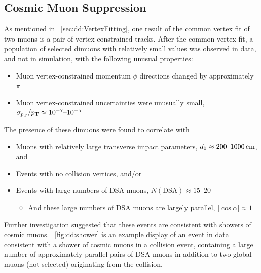 \subsection{Cosmic Muon Suppression}
\label{sec:dd:CosmicCuts}
As mentioned in \Sec~\ref{sec:dd:VertexFitting}, one result of the common vertex fit of two muons is a pair of vertex-constrained tracks.
After the common vertex fit, a population of selected dimuons with relatively small \vchisq values was observed in data, and not in simulation, with the following unusual properties:
\begin{itemize}
  \item Muon vertex-constrained momentum $\phi$ directions changed by approximately $\pi$
  \item Muon vertex-constrained \pT uncertainties were unusually small, \ie $\sigma_{p_{\mathrm{T}}}/p_{\mathrm{T}} \approx 10^{-7}\text{--}10^{-5}$
\end{itemize}
The presence of these dimuons were found to correlate with
\begin{itemize}
  \item Muons with relatively large transverse impact parameters, \ie $d_0 \approx 200\text{--}1000\,\text{cm}$, and
  \item Events with no \pp collision vertices, and/or
  \item Events with large numbers of DSA muons, \ie $N(\text{DSA}) \approx 15\text{--}20$
    \begin{itemize}
      \item And these large numbers of DSA muons are largely parallel, \ie $|\cos{\alpha}| \approx 1$
    \end{itemize}
\end{itemize}
Further investigation suggested that these events are consistent with showers of cosmic muons.
\Fig~\ref{fig:dd:shower} is an example display of an event in data consistent with a shower of cosmic muons in a \pp collision event, containing a large number of approximately parallel pairs of DSA muons in addition to two global muons (not selected) originating from the \pp collision.

